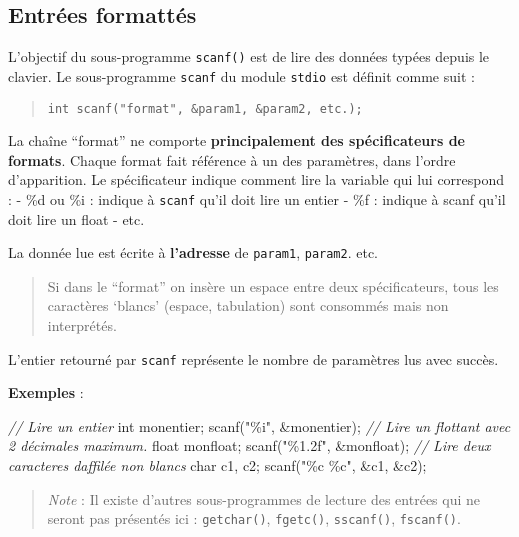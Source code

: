 \documentclass[11pt]{article}
\newenvironment{Shaded}{}{}
\newcommand{\DataTypeTok}[1]{\textcolor[rgb]{0.56,0.13,0.00}{{#1}}}
\newcommand{\StringTok}[1]{\textcolor[rgb]{0.25,0.44,0.63}{{#1}}}
\newcommand{\CommentTok}[1]{\textcolor[rgb]{0.38,0.63,0.69}{\textit{{#1}}}}
\newcommand{\NormalTok}[1]{{#1}}
\begin{document}
    \hypertarget{entruxe9es-formattuxe9s}{%
\subsection{Entrées formattés}\label{entruxe9es-formattuxe9s}}

L'objectif du sous-programme \texttt{scanf()} est de lire des données
typées depuis le clavier. Le sous-programme \texttt{scanf} du module
\texttt{stdio} est définit comme suit :

\begin{quote}
\texttt{int\ scanf("format",\ \&param1,\ \&param2,\ etc.);}
\end{quote}

La chaîne ``format'' ne comporte \textbf{principalement des
spécificateurs de formats}. Chaque format fait référence à un des
paramètres, dans l'ordre d'apparition. Le spécificateur indique comment
lire la variable qui lui correspond : - \%d ou \%i : indique à
\texttt{scanf} qu'il doit lire un entier - \%f : indique à scanf qu'il
doit lire un float - etc.

La donnée lue est écrite à \textbf{l'adresse} de \texttt{param1},
\texttt{param2}. etc.

\begin{quote}
Si dans le ``format'' on insère un espace entre deux spécificateurs,
tous les caractères `blancs' (espace, tabulation) sont consommés mais
non interprétés.
\end{quote}

L'entier retourné par \texttt{scanf} représente le nombre de paramètres
lus avec succès.

\textbf{Exemples} :

\begin{Shaded}
\begin{Highlighting}[]
\CommentTok{// Lire un entier}
\DataTypeTok{int}\NormalTok{ monentier;}
\NormalTok{scanf(}\StringTok{"\%i"}\NormalTok{, \&monentier);}
\CommentTok{// Lire un flottant avec 2 décimales maximum.}
\DataTypeTok{float}\NormalTok{ monfloat;}
\NormalTok{scanf(}\StringTok{"\%1.2f"}\NormalTok{, \&monfloat); }
\CommentTok{// Lire deux caracteres d\textquotesingle{}affilée non blancs}
\DataTypeTok{char}\NormalTok{ c1, c2;}
\NormalTok{scanf(}\StringTok{"\%c \%c"}\NormalTok{, \&c1, \&c2);}
\end{Highlighting}
\end{Shaded}

\begin{quote}
\emph{Note} : Il existe d'autres sous-programmes de lecture des entrées
qui ne seront pas présentés ici : \texttt{getchar()}, \texttt{fgetc()},
\texttt{sscanf()}, \texttt{fscanf()}.
\end{quote}
\end{document}
